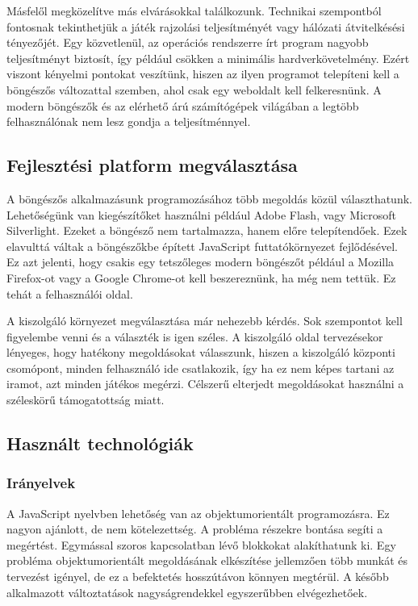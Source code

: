 \documentclass[bibliography=totocnumbered]{article}
\begin{document}
Másfelől megközelítve más elvárásokkal találkozunk. Technikai
szempontból fontosnak tekinthetjük a játék rajzolási teljesítményét vagy
hálózati átvitelkésési tényezőjét. Egy közvetlenül, az operációs
rendszerre írt program nagyobb teljesítményt biztosít, így például
csökken a minimális hardverkövetelmény. Ezért viszont kényelmi pontokat
veszítünk, hiszen az ilyen programot telepíteni kell a böngészős
változattal szemben, ahol csak egy weboldalt kell felkeresnünk. A modern
böngészők és az elérhető árú számítógépek világában a legtöbb
felhasználónak nem lesz gondja a teljesítménnyel.


\subsection{Fejlesztési platform
megválasztása}

A böngészős alkalmazásunk programozásához több megoldás közül
választhatunk. Lehetőségünk van kiegészítőket használni például Adobe
Flash, vagy Microsoft Silverlight. Ezeket a böngésző nem tartalmazza,
hanem előre telepítendőek. Ezek elavulttá váltak a böngészőkbe épített
JavaScript futtatókörnyezet fejlődésével. Ez azt jelenti, hogy csakis
egy tetszőleges modern böngészőt például a Mozilla Firefox-ot vagy a
Google Chrome-ot kell beszereznünk, ha még nem tettük. Ez tehát a
felhasználói oldal.

A kiszolgáló környezet megválasztása már nehezebb kérdés. Sok szempontot
kell figyelembe venni és a választék is igen széles. A kiszolgáló oldal
tervezésekor lényeges, hogy hatékony megoldásokat válasszunk, hiszen a
kiszolgáló központi csomópont, minden felhasználó ide csatlakozik, így
ha ez nem képes tartani az iramot, azt minden játékos megérzi. Célszerű
elterjedt megoldásokat használni a széleskörű támogatottság miatt.


\subsection{Használt
technológiák}


\subsubsection{Irányelvek}

A JavaScript nyelvben lehetőség van az objektumorientált programozásra.
Ez nagyon ajánlott, de nem kötelezettség. A probléma részekre bontása
segíti a megértést. Egymással szoros kapcsolatban lévő blokkokat
alakíthatunk ki. Egy probléma objektumorientált megoldásának elkészítése
jellemzően több munkát és tervezést igényel, de ez a befektetés
hosszútávon könnyen megtérül. A később alkalmazott változtatások
nagyságrendekkel egyszerűbben elvégezhetőek.
\end{document}
